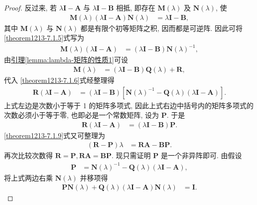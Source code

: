 \documentclass[../../main.tex]{subfiles}
\begin{document}
\begin{proof}
反过来, 若 $\lambda\boldsymbol{I}-\boldsymbol{A}$ 与 $\lambda\boldsymbol{I}-\boldsymbol{B}$ 相抵, 即存在 $\boldsymbol{M}(\lambda)$ 及 $\boldsymbol{N}(\lambda)$, 使
\begin{align}
\boldsymbol{M}(\lambda)(\lambda\boldsymbol{I}-\boldsymbol{A})\boldsymbol{N}(\lambda)&=\lambda\boldsymbol{I}-\boldsymbol{B}, \label{theorem1213-7.1.5}
\end{align}
其中 $\boldsymbol{M}(\lambda)$ 与 $\boldsymbol{N}(\lambda)$ 都是有限个初等矩阵之积, 因而都是可逆阵. 因此可将 \eqref{theorem1213-7.1.5}式写为
\begin{align}
\boldsymbol{M}(\lambda)(\lambda\boldsymbol{I}-\boldsymbol{A})&=(\lambda\boldsymbol{I}-\boldsymbol{B})\boldsymbol{N}(\lambda)^{-1}, \label{theorem1213-7.1.6}
\end{align}
由\hyperref[lemma:lambda-矩阵的性质1]{引理\ref{lemma:lambda-矩阵的性质1}}可设
\begin{align*}
\boldsymbol{M}(\lambda)&=(\lambda\boldsymbol{I}-\boldsymbol{B})\boldsymbol{Q}(\lambda)+\boldsymbol{R},
\end{align*}
代入 \eqref{theorem1213-7.1.6}式经整理得
\begin{align*}
\boldsymbol{R}(\lambda\boldsymbol{I}-\boldsymbol{A})&=(\lambda\boldsymbol{I}-\boldsymbol{B})[\boldsymbol{N}(\lambda)^{-1}-\boldsymbol{Q}(\lambda)(\lambda\boldsymbol{I}-\boldsymbol{A})].
\end{align*}
上式左边是次数小于等于 1 的矩阵多项式, 因此上式右边中括号内的矩阵多项式的次数必须小于等于零, 也即必是一个常数矩阵, 设为 $\boldsymbol{P}$. 于是
\begin{align}
\boldsymbol{R}(\lambda\boldsymbol{I}-\boldsymbol{A})&=(\lambda\boldsymbol{I}-\boldsymbol{B})\boldsymbol{P}. \label{theorem1213-7.1.9}
\end{align}
\eqref{theorem1213-7.1.9}式又可整理为
\begin{align*}
(\boldsymbol{R}-\boldsymbol{P})\lambda&=\boldsymbol{R}\boldsymbol{A}-\boldsymbol{B}\boldsymbol{P}.
\end{align*}
再次比较次数得 $\boldsymbol{R}=\boldsymbol{P}, \boldsymbol{R}\boldsymbol{A}=\boldsymbol{B}\boldsymbol{P}$. 现只需证明 $\boldsymbol{P}$ 是一个非异阵即可. 由假设
\begin{align*}
\boldsymbol{P}&=\boldsymbol{N}(\lambda)^{-1}-\boldsymbol{Q}(\lambda)(\lambda\boldsymbol{I}-\boldsymbol{A}),
\end{align*}
将上式两边右乘 $\boldsymbol{N}(\lambda)$ 并移项得
\begin{align*}
\boldsymbol{P}\boldsymbol{N}(\lambda)+\boldsymbol{Q}(\lambda)(\lambda\boldsymbol{I}-\boldsymbol{A})\boldsymbol{N}(\lambda)&=\boldsymbol{I}.

\end{align*}
\end{proof}
\end{document}
